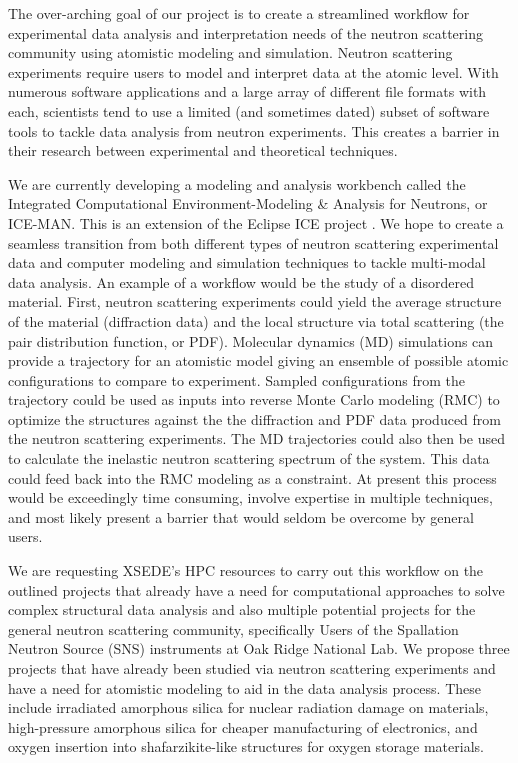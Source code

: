 The over-arching goal of our project is to create a streamlined workflow
for experimental data analysis and interpretation
needs of the neutron scattering community using atomistic modeling and
simulation. Neutron scattering experiments require users to model and
interpret data at the atomic level. With numerous software
applications and a large array of different file formats with each,
scientists tend to use a limited (and sometimes dated) subset of
software tools to tackle data analysis from neutron experiments. This
creates a barrier in their research between experimental and theoretical techniques.

We are currently developing a modeling and analysis workbench called the 
Integrated Computational Environment-Modeling \& Analysis for Neutrons,
or ICE-MAN. This is an extension of the Eclipse ICE project \cite{ICEwebsite}. We hope to create a seamless transition from both different
types of neutron scattering experimental data and computer modeling and
simulation techniques to tackle multi-modal data
analysis. An example of a workflow would be the study of a disordered
material. First, neutron scattering experiments could yield the average
structure of the material (diffraction data) and
the local structure via total scattering (the pair
distribution function, or PDF).  Molecular dynamics (MD) simulations can provide
a trajectory for an atomistic model  giving an
ensemble of possible atomic configurations to compare to experiment.
Sampled configurations from the trajectory could be used as inputs into reverse Monte Carlo modeling (RMC) to optimize the structures against the the diffraction and PDF data produced from the neutron scattering experiments.
The MD trajectories could also then be used to calculate the
inelastic neutron scattering spectrum of the system. This data could
feed back into the RMC modeling as a constraint. At present this process
would be exceedingly time consuming, involve expertise in multiple
techniques, and most likely present a barrier that would
seldom be overcome by general users.

We are requesting XSEDE's HPC resources to carry out this workflow on the outlined projects that already have a need for computational approaches to solve complex structural data analysis and also multiple potential projects for the general neutron scattering community, specifically Users of the Spallation Neutron Source (SNS) instruments at Oak Ridge National Lab. We propose three projects that have already been studied via neutron scattering experiments and have a need for atomistic modeling to aid in the data analysis process. These include irradiated amorphous silica for nuclear radiation damage on materials, high-pressure amorphous silica for cheaper manufacturing of electronics, and oxygen insertion into shafarzikite-like structures for oxygen storage materials.
